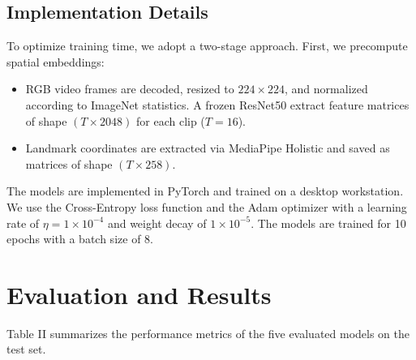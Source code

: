 \documentclass[conference]{IEEEtran}
\begin{document}
\subsection{Implementation Details}
To optimize training time, we adopt a two-stage approach. First, we precompute spatial embeddings:
\begin{itemize}
    \item RGB video frames are decoded, resized to $224 \times 224$, and normalized according to ImageNet statistics. A frozen ResNet50 extract feature matrices of shape $(T \times 2048)$ for each clip ($T=16$).
    \item Landmark coordinates are extracted via MediaPipe Holistic and saved as matrices of shape $(T \times 258)$.
\end{itemize}
The models are implemented in PyTorch and trained on a desktop workstation. We use the Cross-Entropy loss function and the Adam optimizer with a learning rate of $\eta = 1\times 10^{-4}$ and weight decay of $1\times 10^{-5}$. The models are trained for 10 epochs with a batch size of 8.

\section{Evaluation and Results}
Table II summarizes the performance metrics of the five evaluated models on the test set.
\end{document}
